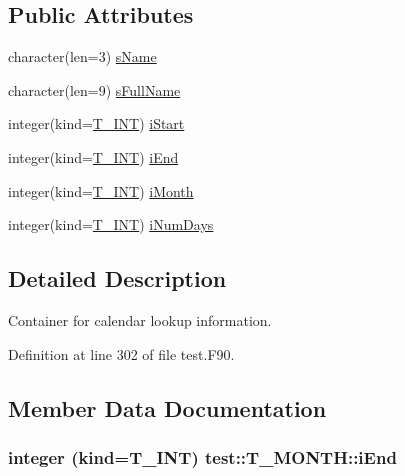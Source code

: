 \subsection*{Public Attributes}
\begin{DoxyCompactItemize}
\item 
character(len=3) \hyperlink{typetest_1_1_t___m_o_n_t_h_a90e4d6c7a2daec91a7923b51a500983b}{sName}
\item 
character(len=9) \hyperlink{typetest_1_1_t___m_o_n_t_h_aaf3cd930d44866feb833cbaac6af9af5}{sFullName}
\item 
integer(kind=\hyperlink{namespacetest_a6f91ebd89b58cfcc5da99faed9385c1e}{T\_\-INT}) \hyperlink{typetest_1_1_t___m_o_n_t_h_a8824b1666706cf6ca7c75ac95054571b}{iStart}
\item 
integer(kind=\hyperlink{namespacetest_a6f91ebd89b58cfcc5da99faed9385c1e}{T\_\-INT}) \hyperlink{typetest_1_1_t___m_o_n_t_h_ad224151c775ef43ecffc4bae6be41ba0}{iEnd}
\item 
integer(kind=\hyperlink{namespacetest_a6f91ebd89b58cfcc5da99faed9385c1e}{T\_\-INT}) \hyperlink{typetest_1_1_t___m_o_n_t_h_a407be426a9598375ea97130260d4eb27}{iMonth}
\item 
integer(kind=\hyperlink{namespacetest_a6f91ebd89b58cfcc5da99faed9385c1e}{T\_\-INT}) \hyperlink{typetest_1_1_t___m_o_n_t_h_a18c9a8c3120a2f45a8a3b6d59f40221a}{iNumDays}
\end{DoxyCompactItemize}


\subsection{Detailed Description}
Container for calendar lookup information. 

Definition at line 302 of file test.F90.



\subsection{Member Data Documentation}
\hypertarget{typetest_1_1_t___m_o_n_t_h_ad224151c775ef43ecffc4bae6be41ba0}{
\subsubsection[{iEnd}]{\setlength{\rightskip}{0pt plus 5cm}integer (kind={\bf T\_\-INT}) {\bf test::T\_\-MONTH::iEnd}}}
\label{typetest_1_1_t___m_o_n_t_h_ad224151c775ef43ecffc4bae6be41ba0}


